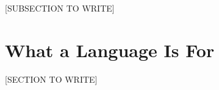 \documentclass[12pt]{article}
\begin{document}

[SUBSECTION TO WRITE]

\section{What a Language Is For}
\label{sec:closing}


[SECTION TO WRITE]



\end{document}
